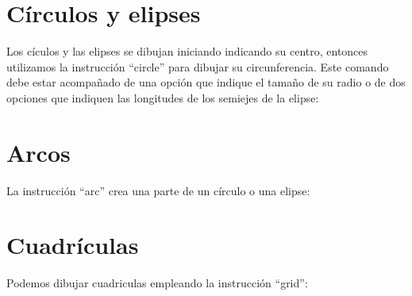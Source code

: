 \documentclass[12pt,letterpaper]{article}
\begin{document}
\section*{Círculos y elipses}

Los cículos y las elipses se dibujan iniciando indicando su centro, entonces utilizamos la instrucción ``circle'' para dibujar su circunferencia. Este comando debe estar acompañado de una opción que indique el tamaño de su radio o de dos opciones que indiquen las longitudes de los semiejes de la elipse:


\section*{Arcos}

La instrucción ``arc'' crea una parte de un círculo o una elipse:






\section*{Cuadrículas}

Podemos dibujar cuadriculas empleando la instrucción ``grid'':


\end{document}
